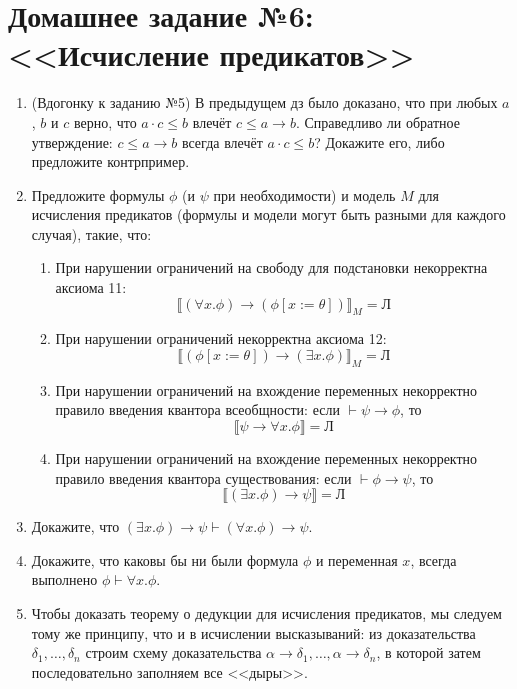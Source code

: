 \documentclass[10pt,a4paper,oneside]{article}
\begin{document}
\section*{Домашнее задание №6: <<Исчисление предикатов>>}

\begin{enumerate}
\item (Вдогонку к заданию №5) В предыдущем дз было доказано, что 
при любых $a$, $b$ и $c$ верно, что $a\cdot c \le b$ влечёт 
$c \le a \rightarrow b$. Справедливо ли обратное утверждение: 
$c \le a \rightarrow b$ всегда влечёт $a\cdot c \le b$? Докажите его,
либо предложите контрпример.

\item Предложите формулы $\phi$ (и $\psi$ при необходимости) 
и модель $M$ для исчисления предикатов (формулы и модели могут быть 
разными для каждого случая), такие, что:
\begin{enumerate}
\item При нарушении ограничений на свободу для подстановки некорректна 
аксиома 11: $$\llbracket(\forall x.\phi)\rightarrow(\phi[x := \theta])\rrbracket_M = \mbox{Л}$$
\item При нарушении ограничений некорректна аксиома 12:
$$\llbracket(\phi[x := \theta])\rightarrow(\exists x.\phi)\rrbracket_M = \mbox{Л}$$
\item При нарушении ограничений на вхождение переменных некорректно правило
введения квантора всеобщности: если $\vdash \psi\rightarrow\phi$, то
$$\llbracket \psi\rightarrow\forall x.\phi\rrbracket = \mbox{Л}$$
\item При нарушении ограничений на вхождение переменных некорректно правило
введения квантора существования: если $\vdash \phi\rightarrow\psi$, то
$$\llbracket (\exists x.\phi)\rightarrow\psi\rrbracket = \mbox{Л}$$
\end{enumerate}
\item Докажите, что $(\exists x.\phi)\rightarrow\psi\vdash(\forall x.\phi)\rightarrow\psi$.
\item Докажите, что каковы бы ни были формула $\phi$ и переменная $x$, всегда
выполнено $\phi \vdash \forall x.\phi$.
\item Чтобы доказать теорему о дедукции для исчисления предикатов, 
мы следуем тому же принципу, что и в исчислении высказываний: из 
доказательства $\delta_1, \dots, \delta_n$ строим схему доказательства
$\alpha\rightarrow\delta_1, \dots, \alpha\rightarrow\delta_n$, в которой
затем последовательно заполняем все <<дыры>>.


\end{enumerate}
\end{document}
